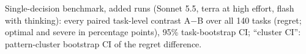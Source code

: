 \begin{table}[!htbp]
\centering
\caption{Single-decision benchmark, added runs (Sonnet 5.5, terra at high effort, flash with thinking): every paired task-level contrast A$-$B over all 140 tasks (regret; optimal and severe in percentage points), 95\% task-bootstrap CI; ``cluster CI'': pattern-cluster bootstrap CI of the regret difference.}
\label{tab:llm-contrasts-added}
\scriptsize
\setlength{\tabcolsep}{3pt}
\resizebox{\linewidth}{!}{}
\end{table}
